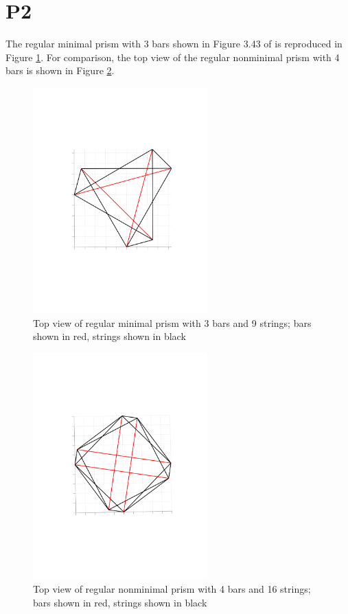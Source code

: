 \documentclass{article}
\begin{document}
\section{P2}

The regular minimal prism with 3 bars shown in Figure 3.43 of \cite{skelton} is reproduced in Figure \ref{fig:m3}.
For comparison, the top view of the regular nonminimal prism with 4 bars is shown in Figure \ref{fig:np_top}.

\begin{figure}[H]
  \centering
  \includegraphics[clip, trim=3.5cm 7.5cm 2.5cm 7.5cm, width=0.6\textwidth]{images/minimal_prism_3.pdf}
  \caption{Top view of regular minimal prism with 3 bars and 9 strings; bars shown in red, strings shown in black}
  \label{fig:m3}
\end{figure}

\begin{figure}[H]
  \centering
  \includegraphics[clip, trim=3.5cm 7.5cm 2.5cm 7.5cm, width=0.6\textwidth]{images/nonminimal_prism_4_top.pdf}
  \caption{Top view of regular nonminimal prism with 4 bars and 16 strings; bars shown in red, strings shown in black}
  \label{fig:np_top}
\end{figure}
\end{document}
